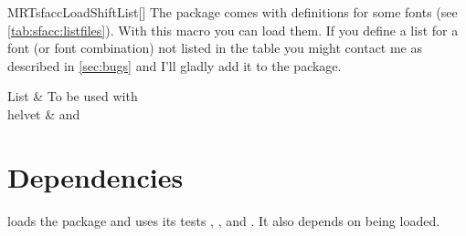 \begin{describemacro}{MRTsfaccLoadShiftList}[]
  The package comes with definitions for some fonts (see
  \autoref{tab:sfacc:listfiles}). With this macro you can load them. If you
  define a list for a font (or font combination) not listed in the table you
  might contact me as described in \autoref{sec:bugs} and I'll gladly add it
  to the package.
\end{describemacro}

\begin{MRTtable}%
  [
    ,col={>{\ttfamily}l >{\raggedright\arraybackslash}p{.55\linewidth}}
    ,cap={Available shift definition lists}
    ,label={tab:sfacc:listfiles}
  ]
    \normalfont List & To be used with\\
    helvet &  and 
    \\
\end{MRTtable}%

\section{Dependencies}
 loads the  package and uses its tests
, ,  and
. It also depends on  being loaded.
